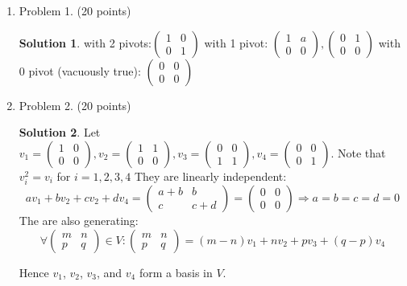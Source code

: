 \documentclass[]{book}
\theoremstyle{definition}
\newtheorem*{soln}{Solution}
\newcommand{\0}{\mathbf{0}}
\begin{document}
\begin{enumerate}
\item Problem 1. (20 points)
\begin{soln} with 2 pivots:$
\begin{pmatrix}
1 & 0\\
0 & 1
\end{pmatrix}$\newline
with 1 pivot: $\begin{pmatrix}
1 & a\\
0 & 0
\end{pmatrix}, \begin{pmatrix}
0 & 1\\
0 & 0
\end{pmatrix}$\newline
with 0 pivot (vacuously true): $\begin{pmatrix}
0 & 0\\
0 & 0
\end{pmatrix}$
\end{soln}

\item Problem 2. (20 points)
\begin{soln}
Let $v_1=\begin{pmatrix}
1 & 0\\
0 & 0
\end{pmatrix},v_2=\begin{pmatrix}
1 & 1\\
0 & 0
\end{pmatrix},v_3=\begin{pmatrix}
0 & 0\\
1 & 1
\end{pmatrix},v_4=\begin{pmatrix}
0 & 0\\
0 & 1
\end{pmatrix}$.\newline 
Note that $v_i^2=v_i$ for $i=1,2,3,4$\newline
They are linearly independent:
\[av_1+bv_2+cv_2+dv_4=\begin{pmatrix}
a+b & b \\
c & c+d
\end{pmatrix}=\begin{pmatrix}
0 & 0\\
0 & 0
\end{pmatrix}\Rightarrow a=b=c=d=0\]
The are also generating:
\[\forall \begin{pmatrix}
m & n\\
p & q
\end{pmatrix}\in V:\begin{pmatrix}
m & n\\
p & q
\end{pmatrix}=(m-n)v_1+nv_2+pv_3+(q-p)v_4\]
\end{soln}
Hence $v_1$, $v_2$, $v_3$, and $v_4$ form a basis in $V$.


\end{enumerate}
\end{document}
